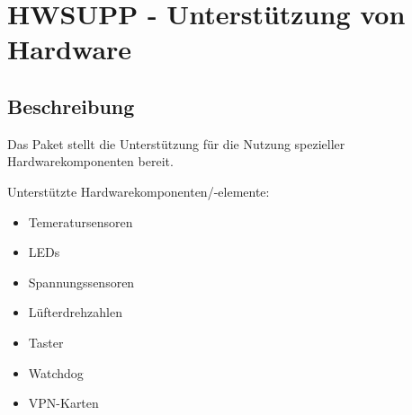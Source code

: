 \section {HWSUPP - Unterstützung von Hardware}

\subsection {Beschreibung}

Das Paket stellt die Unterstützung für die Nutzung spezieller Hardwarekomponenten bereit.

Unterstützte Hardwarekomponenten/-elemente:
\begin{itemize}
\item Temeratursensoren
\item LEDs
\item Spannungssensoren
\item Lüfterdrehzahlen
\item Taster
\item Watchdog
\item VPN-Karten
\end{itemize}

